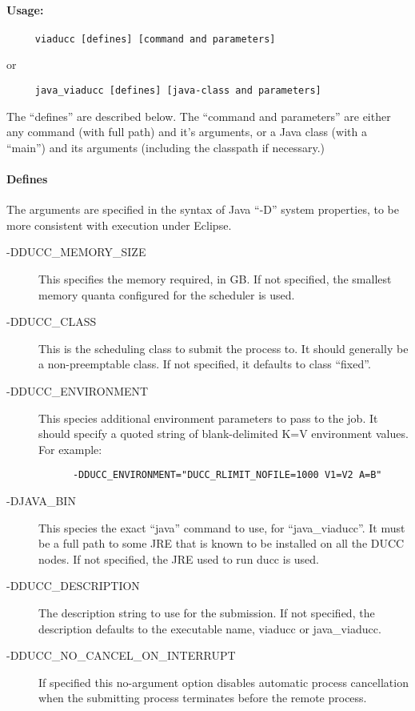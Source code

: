     \paragraph{Usage:}
\begin{verbatim}
     viaducc [defines] [command and parameters]
\end{verbatim}
     or
\begin{verbatim}
     java_viaducc [defines] [java-class and parameters]
\end{verbatim}

     The ``defines'' are described below.  The ``command and parameters'' are either any command
     (with full path) and it's arguments, or a Java class (with a ``main'') and its arguments (including
     the classpath if necessary.)

     \paragraph{Defines}

     The arguments are specified in the syntax of Java ``-D'' system properties, to be more consistent
     with execution under Eclipse.
     \begin{description}
         \item[-DDUCC\_MEMORY\_SIZE] This specifies the memory required, in GB.  If not specified, the
           smallest memory quanta configured for the scheduler is used.
         \item[-DDUCC\_CLASS] This is the scheduling class to submit the process to.  It should generally
           be a non-preemptable class.  If not specified, it defaults to class ``fixed''.
         \item[-DDUCC\_ENVIRONMENT] This species additional environment parameters to pass to the job.
           It should specify a quoted string of blank-delimited K=V environment values.  For example:
\begin{verbatim}
      -DDUCC_ENVIRONMENT="DUCC_RLIMIT_NOFILE=1000 V1=V2 A=B"
\end{verbatim}
         \item[-DJAVA\_BIN] This species the exact ``java'' command to use, for ``java\_viaducc''.  It
           must be a full path to some JRE that is known to be installed on all the DUCC nodes.  If not
           specified, the JRE used to run ducc is used.
         \item[-DDUCC\_DESCRIPTION] The description string to use for the submission.
           If not specified, the description defaults to the executable name, viaducc or java\_viaducc.
         \item[-DDUCC\_NO\_CANCEL\_ON\_INTERRUPT] If specified this no-argument option disables 
           automatic process cancellation when the submitting process terminates before the remote process.
    \end{description}
        
